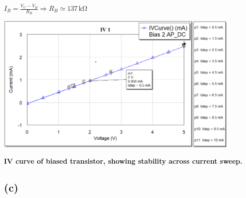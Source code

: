 \documentclass[12pt]{article}
\begin{document}
$I_B = \frac{V_C - V_B}{R_B} \Rightarrow R_B \simeq 137\,\unit{\kilo\ohm}$

\begin{center}
    \includegraphics[width=0.9\textwidth]{5 iv1.png}

    \textbf{IV curve of biased transistor, showing stability across current sweep.}
\end{center}

\subsection*{(c)}
\end{document}
